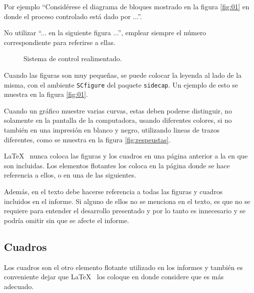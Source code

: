 Por ejemplo ``Considérese el diagrama de bloques mostrado en la figura \ref{fig:01} en donde el proceso controlado está dado por ...''.

No utilizar ``... en la siguiente figura ...'', emplear siempre el número correspondiente para referirse a ellas.

\begin{figure}
\caption{Sistema de control realimentado.} \label{fig:01x}
\end{figure}

Cuando las figuras son muy pequeñas, se puede colocar la leyenda al lado de la misma, con el ambiente \texttt{SCfigure} del paquete \texttt{sidecap}.  Un ejemplo de esto se muestra en la figura \ref{fig:01}.

\begin{SCfigure}
\caption{Lazo de control de un proceso de una entrada y una salida.} \label{fig:01}
\end{SCfigure}

Cuando un gráfico muestre varias curvas, estas deben poderse distinguir, no solamente en la pantalla de la computadora, usando diferentes colores, si no también en una impresión en blanco y negro, utilizando lineas de trazos diferentes, como se muestra en la figura \ref{fig:respeustas}.

\begin{SCfigure}
\caption{Respuesta del circuito simulado, para dos valores de $R_5$.} \label{fig:respeustas}
\end{SCfigure}

\LaTeX~ nunca coloca las figuras y los cuadros en una página anterior a la en que son incluidas.  Los elementos flotantes los coloca en la página donde se hace referencia a ellos, o en una de las siguientes.

Además, en el texto debe hacerse referencia a todas las figuras y cuadros incluidos en el informe.  Si alguno de ellos no se menciona en el texto, es que no se requiere para entender el desarrollo presentado y por lo tanto es innecesario y se podría omitir sin que se afecte el informe.

\subsection{Cuadros}
Los cuadros son el otro elemento flotante utilizado en los informes y también es conveniente dejar que \LaTeX~ los coloque en donde considere que es más adecuado.

